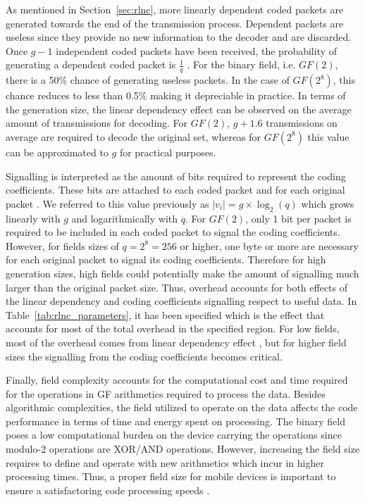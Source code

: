 As mentioned in Section~\ref{sec:rlnc}, more linearly dependent coded packets are generated towards the end of the transmission process. Dependent packets are useless since they provide no new information to the decoder and are discarded. Once $g - 1$ independent coded packets have been received, the probability of generating a dependent coded packet is $\frac{1}{q}$ \cite{lucani2009random,trullols2011exact,zhao2012notes}. For the binary field, i.e. $GF(2)$, there is a 50\% chance of generating useless packets. In the case of $GF(2^8)$, this chance reduces to less than 0.5\% making it depreciable in practice. In terms of the generation size, the linear dependency effect can be observed on the average amount of transmissions for decoding. For $GF(2)$, $g + 1.6$ transmissions on average are required to decode the original set, whereas for $GF(2^8)$ this value can be approximated to $g$ for practical purposes.

Signalling is interpreted as the amount of bits required to represent the coding coefficients. These bits are attached to each coded packet and for each original packet \cite{heide2011code}. We referred to this value previously as $|v_{i}| = g \times \log_{2}(q)$ which grows linearly with $g$ and logarithmically with $q$. For $GF(2)$, only 1 bit per packet is required to be included in each coded packet to signal the coding coefficients. However, for fields sizes of $q = 2^8 = 256$ or higher, one byte or more are necessary for each original packet to signal its coding coefficients. Therefore for high generation sizes, high fields could potentially make the amount of signalling much larger than the original packet size. Thus, overhead accounts for both effects of the linear dependency and coding coefficients signalling respect to useful data. In Table~\ref{tab:rlnc_parameters}, it has been specified which is the effect that accounts for most of the total overhead in the specified region. For low fields, most of the overhead comes from linear dependency effect , but for higher field sizes the signalling from the coding coefficients becomes critical.

Finally, field complexity accounts for the computational cost and time required for the operations in \ac{GF} arithmetics required to process the data. Besides algorithmic complexities, the field utilized to operate on the data affects the code performance in terms of time and energy spent on processing. The binary field poses a low computational burden on the device carrying the operations since modulo-2 operations are XOR/AND operations. However, increasing the field size requires to define and operate with new arithmetics which incur in higher processing times. Thus, a proper field size for mobile devices is important to ensure a satisfactoring code processing speeds \cite{heide2009network,paramanathan2013lean}.

